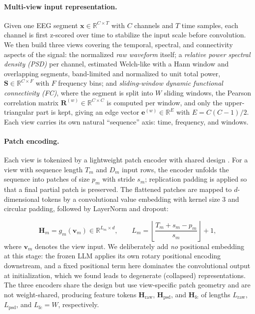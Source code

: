 \paragraph{Multi-view input representation.}
Given one EEG segment $\mathbf{x} \in \mathbb{R}^{C \times T}$ with $C$
channels and $T$ time samples, each channel is first z-scored over time to
stabilize the input scale before convolution. We then build three views
covering the temporal, spectral, and connectivity aspects of the signal: the
normalized \emph{raw waveform} itself; a \emph{relative power spectral
density (PSD)} per channel, estimated Welch-like with a Hann window and
overlapping segments, band-limited and normalized to unit total power,
$\mathbf{S} \in \mathbb{R}^{C \times F}$ with $F$ frequency bins; and
\emph{sliding-window dynamic functional connectivity (FC)}, where the segment
is split into $W$ sliding windows, the Pearson correlation matrix
$\mathbf{R}^{(w)} \in \mathbb{R}^{C \times C}$ is computed per window, and
only the upper-triangular part is kept, giving an edge vector
$\mathbf{e}^{(w)} \in \mathbb{R}^{E}$ with $E = C(C-1)/2$. Each view carries
its own natural ``sequence'' axis: time, frequency, and windows.

\paragraph{Patch encoding.}
Each view is tokenized by a lightweight patch encoder with shared design
. For a view with sequence length $T_m$ and $D_m$ input
rows, the encoder unfolds the sequence into patches of size $p_m$ with stride
$s_m$; replication padding is applied so that a final partial patch is
preserved. The flattened patches are mapped to $d$-dimensional tokens by a
convolutional value embedding with kernel size 3 and circular padding,
followed by LayerNorm and dropout:

\begin{equation}
  \mathbf{H}_m = g_m(\mathbf{v}_m) \in \mathbb{R}^{L_m \times d},
  \qquad L_m = \left\lfloor \frac{T_m + s_m - p_m}{s_m} \right\rfloor + 1 ,
\end{equation}
where $\mathbf{v}_m$ denotes the view input. We deliberately add
\emph{no} positional embedding at this stage: the frozen LLM applies its own
rotary positional encoding downstream, and a fixed positional term here
dominates the convolutional output at initialization, which we found leads
to degenerate (collapsed) representations. The three encoders share the
design but use view-specific patch geometry and are not weight-shared,
producing feature tokens $\mathbf{H}_{\mathrm{raw}}$,
$\mathbf{H}_{\mathrm{psd}}$, and $\mathbf{H}_{\mathrm{fc}}$ of lengths
$L_{\mathrm{raw}}$, $L_{\mathrm{psd}}$, and $L_{\mathrm{fc}} = W$,
respectively.


